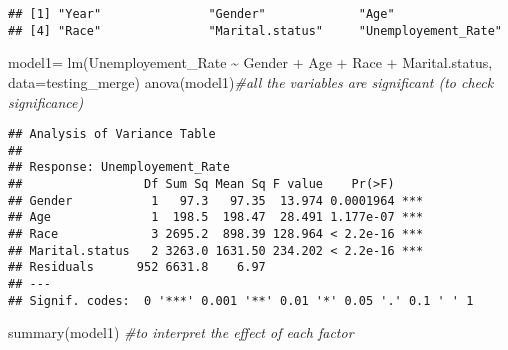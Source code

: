 \documentclass[
]{article}
\newenvironment{Shaded}{\begin{snugshade}}{\end{snugshade}}
\newcommand{\AttributeTok}[1]{\textcolor[rgb]{0.77,0.63,0.00}{#1}}
\newcommand{\CommentTok}[1]{\textcolor[rgb]{0.56,0.35,0.01}{\textit{#1}}}
\newcommand{\FunctionTok}[1]{\textcolor[rgb]{0.00,0.00,0.00}{#1}}
\newcommand{\NormalTok}[1]{#1}
\newcommand{\OtherTok}[1]{\textcolor[rgb]{0.56,0.35,0.01}{#1}}
\newcommand{\SpecialCharTok}[1]{\textcolor[rgb]{0.00,0.00,0.00}{#1}}
\begin{document}
\begin{verbatim}
## [1] "Year"               "Gender"             "Age"               
## [4] "Race"               "Marital.status"     "Unemployement_Rate"
\end{verbatim}

\begin{Shaded}
\begin{Highlighting}[]
\NormalTok{model1}\OtherTok{=} \FunctionTok{lm}\NormalTok{(Unemployement\_Rate }\SpecialCharTok{\textasciitilde{}}\NormalTok{ Gender }\SpecialCharTok{+}\NormalTok{ Age }\SpecialCharTok{+}\NormalTok{ Race }\SpecialCharTok{+}\NormalTok{ Marital.status, }\AttributeTok{data=}\NormalTok{testing\_merge)}
\FunctionTok{anova}\NormalTok{(model1)}\CommentTok{\#all the variables are significant (to check significance)}
\end{Highlighting}
\end{Shaded}

\begin{verbatim}
## Analysis of Variance Table
## 
## Response: Unemployement_Rate
##                 Df Sum Sq Mean Sq F value    Pr(>F)    
## Gender           1   97.3   97.35  13.974 0.0001964 ***
## Age              1  198.5  198.47  28.491 1.177e-07 ***
## Race             3 2695.2  898.39 128.964 < 2.2e-16 ***
## Marital.status   2 3263.0 1631.50 234.202 < 2.2e-16 ***
## Residuals      952 6631.8    6.97                      
## ---
## Signif. codes:  0 '***' 0.001 '**' 0.01 '*' 0.05 '.' 0.1 ' ' 1
\end{verbatim}

\begin{Shaded}
\begin{Highlighting}[]
\FunctionTok{summary}\NormalTok{(model1) }\CommentTok{\#to interpret the effect of each factor}
\end{Highlighting}
\end{Shaded}
\end{document}
